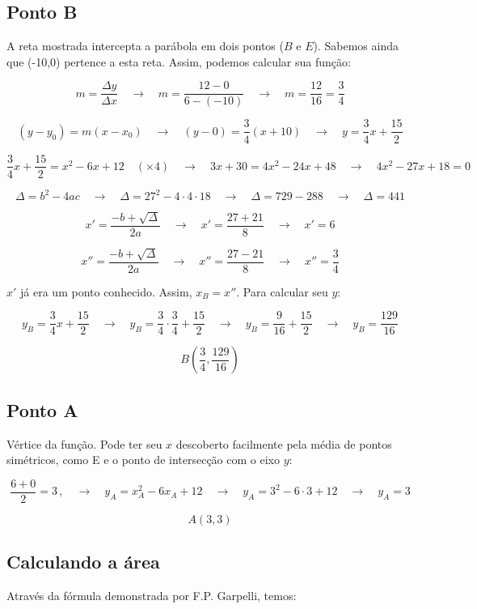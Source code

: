 \documentclass[a4paper,12pt,final]{article}
\newcommand{\qrq}{\quad\rightarrow\quad}
\begin{document}
\subsection*{Ponto B}

A reta mostrada intercepta a parábola em dois pontos ($B$ e $E$). Sabemos
ainda que (-10,0) pertence a esta reta. Assim, podemos calcular sua função:

$$
m = \frac{\Delta y}{\Delta x} \qrq
m = \frac{12 - 0}{6 - (-10)} \qrq
m = \frac{12}{16} = \boxed{\frac{3}{4}}
$$

$$
(y - y_0) = m(x - x_0) \qrq
(y - 0) = \frac{3}{4}(x + 10) \qrq
\boxed{y = \frac{3}{4}x + \frac{15}{2}}
$$

$$
\frac{3}{4}x + \frac{15}{2} =
  x^2 - 6x + 12\quad(\times 4) \qrq
3x + 30 = 4x^2 - 24x + 48 \qrq
\boxed{4x^2 - 27x +18 = 0}
$$

$$
\Delta = b^2 - 4ac \qrq
\Delta = 27^2 - 4\cdot 4\cdot 18 \qrq
\Delta = 729 - 288 \qrq
\Delta = 441
$$

$$
x' = \frac{-b + \sqrt{\Delta}}{2a} \qrq
x' = \frac{27 + 21}{8} \qrq
\boxed{x' = 6}
$$

$$
x'' = \frac{-b + \sqrt{\Delta}}{2a} \qrq
x'' = \frac{27 - 21}{8} \qrq
\boxed{x'' = \frac{3}{4}}
$$

$x'$ já era um ponto conhecido. Assim, $x_B = x''$. Para calcular seu $y$:

$$
y_B = \frac{3}{4}x + \frac{15}{2} \qrq
y_B = \frac{3}{4}\cdot\frac{3}{4} + \frac{15}{2} \qrq
y_B = \frac{9}{16} + \frac{15}{2} \qrq
\boxed{y_B = \frac{129}{16}}
$$

$$ \boxed{B\left(\frac{3}{4},\frac{129}{16}\right)} $$

\subsection*{Ponto A}

Vértice da função. Pode ter seu $x$ descoberto facilmente pela média de
pontos simétricos, como E e o ponto de intersecção com o eixo $y$:

$$
\frac{6 + 0}{2} = 3\,,\quad\longrightarrow\quad
y_A = x_A^2 - 6x_A + 12 \qrq
y_A = 3^2 - 6\cdot 3 + 12 \qrq
y_A = 3
$$

$$ \boxed{A(3,3)} $$

\subsection*{Calculando a área}

Através da fórmula demonstrada por F.P. Garpelli, temos:
\end{document}
